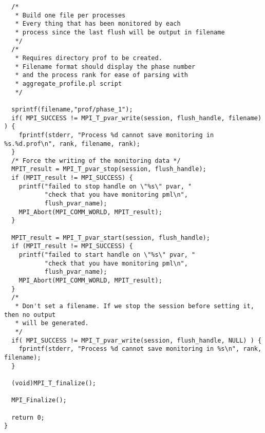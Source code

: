 \documentclass[notitlepage]{article}
\begin{document}
\begin{verbatim}
  /* 
   * Build one file per processes
   * Every thing that has been monitored by each
   * process since the last flush will be output in filename
   */
  /*
   * Requires directory prof to be created.
   * Filename format should display the phase number
   * and the process rank for ease of parsing with
   * aggregate_profile.pl script
   */

  sprintf(filename,"prof/phase_1");
  if( MPI_SUCCESS != MPI_T_pvar_write(session, flush_handle, filename) ) {
    fprintf(stderr, "Process %d cannot save monitoring in %s.%d.prof\n", rank, filename, rank);
  }
  /* Force the writing of the monitoring data */
  MPIT_result = MPI_T_pvar_stop(session, flush_handle);
  if (MPIT_result != MPI_SUCCESS) {
    printf("failed to stop handle on \"%s\" pvar, "
           "check that you have monitoring pml\n",
           flush_pvar_name);
    MPI_Abort(MPI_COMM_WORLD, MPIT_result);
  }

  MPIT_result = MPI_T_pvar_start(session, flush_handle);
  if (MPIT_result != MPI_SUCCESS) {
    printf("failed to start handle on \"%s\" pvar, "
           "check that you have monitoring pml\n",
           flush_pvar_name);
    MPI_Abort(MPI_COMM_WORLD, MPIT_result);
  }
  /* 
   * Don't set a filename. If we stop the session before setting it, then no output
   * will be generated.
   */
  if( MPI_SUCCESS != MPI_T_pvar_write(session, flush_handle, NULL) ) {
    fprintf(stderr, "Process %d cannot save monitoring in %s\n", rank, filename);
  }

  (void)MPI_T_finalize();

  MPI_Finalize();
  
  return 0;
}

\end{verbatim}
\end{document}
